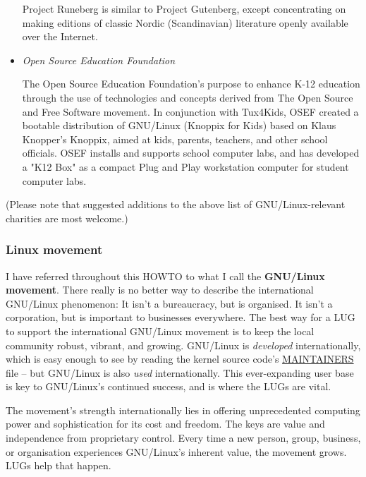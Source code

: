 \begin{itemize}
Project Runeberg is similar to Project Gutenberg, except concentrating
on making editions of classic Nordic (Scandinavian) literature openly
available over the Internet.





\item  
\emph{Open Source Education Foundation} \texttt{\adturl}
 
The Open Source Education Foundation's purpose to enhance K-12 education
through the use of technologies and concepts derived from The Open
Source and Free Software movement.  In conjunction with Tux4Kids, OSEF 
created a bootable distribution of GNU/Linux (Knoppix for Kids) based 
on Klaus Knopper's Knoppix, aimed at kids, parents, teachers, and 
other school officials. OSEF installs and supports school computer labs, 
and has developed a "K12 Box" as a compact Plug and Play workstation 
computer for student computer labs.



\end{itemize}


(Please note that suggested additions to the above list of GNU/Linux-relevant 
charities are most welcome.)






\subsubsection{Linux movement}

I have referred throughout this HOWTO to what I call the {\bfseries GNU/Linux
movement}. There really is no better way to describe the
international GNU/Linux phenomenon: It isn't a bureaucracy, but is
organised. It isn't a corporation, but is important to businesses
everywhere. The best way for a LUG to support the international GNU/Linux
movement is to keep the local community robust, vibrant, and
growing. GNU/Linux is {\itshape developed\/} internationally, which is easy
enough to see by reading the kernel source code's 
\url{MAINTAINERS} file -- but
GNU/Linux is also {\itshape used\/} internationally.  This ever-expanding
user base is key to GNU/Linux's continued success, and is where the LUGs
are vital.

The movement's strength internationally lies in offering
unprecedented computing power and sophistication for its cost and
freedom. The keys are value and independence from proprietary control.
Every time a new person, group, business, or organisation experiences
GNU/Linux's inherent value, the movement grows.  LUGs help that
happen.





